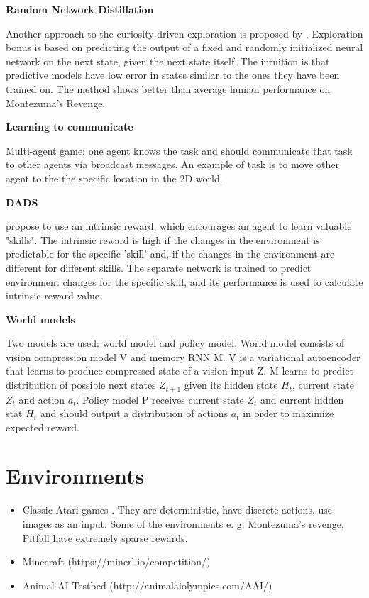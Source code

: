 \documentclass{article}
\begin{document}
\textbf{Random Network Distillation}

Another approach to the curiosity-driven exploration is proposed by \citep{Burda2019ExplorationBR}. Exploration bonus is based on predicting the output of a fixed and randomly initialized neural network on the next state, given the next state itself. The intuition is that predictive models have low error in states similar to the ones they have been trained on. The method shows better than average human performance on Montezuma’s Revenge.

\textbf{Learning to communicate}~\citep{Mordatch2018EmergenceOG}

Multi-agent game: one agent knows the task and should communicate that task to other agents via broadcast messages. An example of task is to move other agent to the the specific location in the 2D world.

\textbf{DADS}

\citep{Sharma2020DynamicsAwareUD} propose to use an intrinsic reward, which encourages an agent to learn valuable "skills". The intrinsic reward is high if the changes in the environment is predictable for the specific 'skill' and, if the changes in the environment are different for different skills. The separate network is trained to predict environment changes for the specific skill, and its performance is used to calculate intrinsic reward value.

\textbf{World models}~\citep{Ha2018RecurrentWM}

Two models are used: world model and policy model. World model consists of vision compression model V and memory RNN M. V is a variational autoencoder that learns to produce compressed state of a vision input Z. M learns to predict distribution of possible next states $Z_{t+1}$ given its hidden state $H_t$, current state $Z_t$ and action $a_t$. Policy model P receives current state $Z_t$ and current hidden stat $H_t$ and should output a distribution of actions $a_t$ in order to maximize expected reward.

\section{Environments}

\begin{itemize}
  \item Classic Atari games \citep{Mnih2013PlayingAW}. They are deterministic, have discrete actions, use images as an input. Some of the environments e. g. Montezuma's revenge, Pitfall have extremely sparse rewards.
  \item Minecraft (https://minerl.io/competition/)
  \item Animal AI Testbed (http://animalaiolympics.com/AAI/)
\end{itemize}



\end{document}
